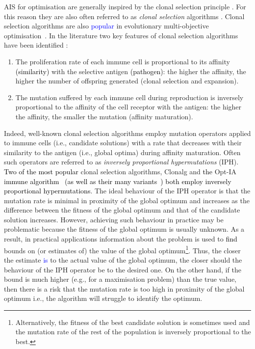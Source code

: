 \documentclass[lettersize,journal]{IEEEtran}
\newcommand{\new}[1]{\textcolor{black}{#1}}
\newcommand{\rev}[1]{\textcolor{blue}{#1}}
\begin{document}
AIS for optimisation \cite{DeCastroTimmisBook,MO2020AAAI} are generally inspired by the clonal selection principle  \cite{Burnet1959}.
For this reason they are also often referred  to as {\it clonal selection} algorithms \cite{DeCastroTimmisBook}. 
Clonal selection algorithms are also \rev{popular} in evolutionary multi-objective optimisation~\cite{CoelloEMO2025,Coello2022,COY25,HuangZhou2020,EMOReview}. 
In the literature two key features of clonal selection algorithms have been identified \cite{Brownlee2007}: 
\begin{enumerate}
	\item  The proliferation rate of each immune cell is proportional to its affinity \new{(similarity)} with the selective antigen \new{(pathogen)}: the higher the affinity, 
	the higher the number of offspring generated (clonal selection and expansion). \item The mutation suffered by each immune cell during reproduction is inversely proportional to the affinity of the cell receptor with the antigen: the higher the affinity, 
	the smaller the mutation (affinity maturation).
\end{enumerate}
Indeed, well-known clonal selection algorithms employ mutation operators applied to immune cells (i.e., candidate solutions) with a rate that decreases with their similarity to the 
antigen (i.e., global optima) during affinity maturation. Often such operators are referred to as {\it inversely proportional hypermutations} (IPH). 
\new{Two of the most popular} clonal selection algorithms, Clonalg \cite{DecastroVonzuben2002}   and \new{the} Opt-IA \new{immune algorithm~\cite{CutelloNicosiaPavoneTimmis2007} (as well as their many variants~\cite{ClonalSelectionReview}) both employ inversely proportional hypermutations}.  
The ideal behaviour of the IPH operator is that the mutation rate is minimal in proximity of the global optimum and increases as the difference between the fitness of the global optimum
and that of the candidate solution increases. However, achieving such behaviour in practice may be problematic because the fitness of the global optimum is usually unknown.
As a result, in practical applications information about the problem is used to \new{find} bounds on (or estimates of)  the value of the global optimum\footnote{Alternatively, the fitness of the best candidate solution is sometimes used and 
	the mutation rate of the rest of the population is inversely proportional to the best.}.
Thus, the closer the estimate \rev{is} to the actual value of the global optimum, the closer should the behaviour of the IPH operator be to the desired one.
On the other hand,  if the bound is much higher (e.g., for a maximisation problem)  than the true value, then there is a risk that the mutation rate is too high in proximity of the global optimum 
i.e., the algorithm will struggle to identify the optimum. 
\end{document}

